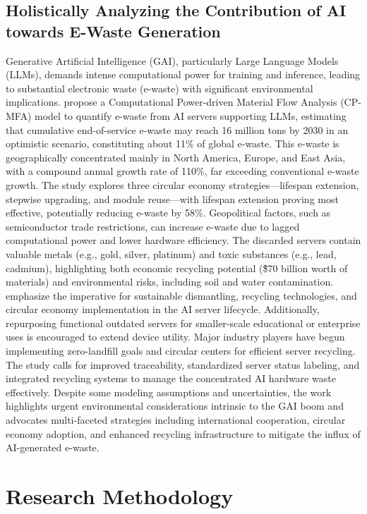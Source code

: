 \documentclass[a4paper, 12pt]{article}
\begin{document}
\subsection{Holistically Analyzing the Contribution of AI towards E-Waste Generation}
Generative Artificial Intelligence (GAI), particularly Large Language Models (LLMs), demands intense computational power for training and inference, leading to substantial electronic waste (e-waste) with significant environmental implications. \citet{wang_2024_ewaste} propose a Computational Power-driven Material Flow Analysis (CP-MFA) model to quantify e-waste from AI servers supporting LLMs, estimating that cumulative end-of-service e-waste may reach 16 million tons by 2030 in an optimistic scenario, constituting about 11\% of global e-waste. This e-waste is geographically concentrated mainly in North America, Europe, and East Asia, with a compound annual growth rate of 110\%, far exceeding conventional e-waste growth. The study explores three circular economy strategies—lifespan extension, stepwise upgrading, and module reuse—with lifespan extension proving most effective, potentially reducing e-waste by 58\%. Geopolitical factors, such as semiconductor trade restrictions, can increase e-waste due to lagged computational power and lower hardware efficiency. The discarded servers contain valuable metals (e.g., gold, silver, platinum) and toxic substances (e.g., lead, cadmium), highlighting both economic recycling potential (\~\$70 billion worth of materials) and environmental risks, including soil and water contamination. \citet{wang_2024_ewaste} emphasize the imperative for sustainable dismantling, recycling technologies, and circular economy implementation in the AI server lifecycle. Additionally, repurposing functional outdated servers for smaller-scale educational or enterprise uses is encouraged to extend device utility. Major industry players have begun implementing zero-landfill goals and circular centers for efficient server recycling. The study calls for improved traceability, standardized server status labeling, and integrated recycling systems to manage the concentrated AI hardware waste effectively. Despite some modeling assumptions and uncertainties, the work highlights urgent environmental considerations intrinsic to the GAI boom and advocates multi-faceted strategies including international cooperation, circular economy adoption, and enhanced recycling infrastructure to mitigate the influx of AI-generated e-waste.

\section{Research Methodology}
\end{document}
